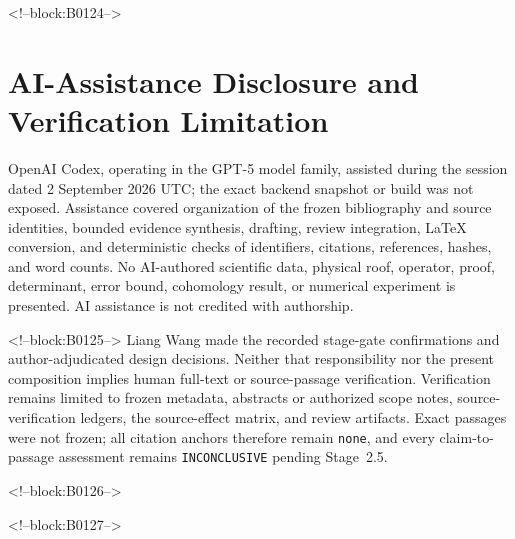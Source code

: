 \documentclass[11pt,a4paper]{article}
\begin{document}
<!--block:B0124-->
\section*{AI-Assistance Disclosure and Verification Limitation}
OpenAI Codex, operating in the GPT-5 model family, assisted during the session dated 2 September 2026 UTC; the exact backend snapshot or build was not exposed. Assistance covered organization of the frozen bibliography and source identities, bounded evidence synthesis, drafting, review integration, LaTeX conversion, and deterministic checks of identifiers, citations, references, hashes, and word counts. No AI-authored scientific data, physical roof, operator, proof, determinant, error bound, cohomology result, or numerical experiment is presented. AI assistance is not credited with authorship.

<!--block:B0125-->
Liang Wang made the recorded stage-gate confirmations and author-adjudicated design decisions. Neither that responsibility nor the present composition implies human full-text or source-passage verification. Verification remains limited to frozen metadata, abstracts or authorized scope notes, source-verification ledgers, the source-effect matrix, and review artifacts. Exact passages were not frozen; all citation anchors therefore remain \texttt{none}, and every claim-to-passage assessment remains \texttt{INCONCLUSIVE} pending Stage~2.5.

<!--block:B0126-->



<!--block:B0127-->
\end{document}
